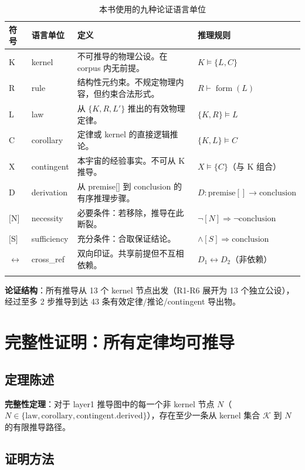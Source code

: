 \begin{center}
\footnotesize
\begin{longtable}{p{0.8cm}p{1.8cm}p{4.5cm}p{7cm}}
\toprule
\textbf{符号} & \textbf{语言单位} & \textbf{定义} & \textbf{推理规则} \\
\midrule
K & kernel & 不可推导的物理公设。在 corpus 内无前提。 & $K \models \{L, C\}$ \\
R & rule & 结构性元约束。不规定物理内容，但约束合法形式。 & $R \vdash \operatorname{form}(L)$ \\
L & law & 从 $\{K, R, L'\}$ 推出的有效物理定律。 & $\{K, R\} \models L$ \\
C & corollary & 定律或 kernel 的直接逻辑推论。 & $\{K, L\} \models C$ \\
X & contingent & 本宇宙的经验事实。不可从 K 推导。 & $X \models \{C\}$（与 K 组合） \\
D & derivation & 从 premise[] 到 conclusion 的有序推理步骤。 & $D: \text{premise}[] \to \text{conclusion}$ \\
$[$N$]$ & necessity & 必要条件：若移除，推导在此断裂。 & $\neg [N] \Rightarrow \neg \text{conclusion}$ \\
$[$S$]$ & sufficiency & 充分条件：合取保证结论。 & $\wedge[S] \Rightarrow \text{conclusion}$ \\
$\leftrightarrow$ & cross\_ref & 双向印证。共享前提但不互相依赖。 & $D_1 \leftrightarrow D_2$（非依赖） \\
\bottomrule
\caption{本书使用的九种论证语言单位}
\end{longtable}
\end{center}

\textbf{论证结构}：所有推导从 13 个 kernel 节点出发（R1-R6 展开为 13 个独立公设），经过至多 2 步推导到达 43 条有效定律/推论/contingent 导出物。

\section{完整性证明：所有定律均可推导}

\subsection{定理陈述}

\textbf{完整性定理}：对于 layer1 推导图中的每一个非 kernel 节点 $N$（$N \in \{\text{law}, \text{corollary}, \text{contingent.derived}\}$），存在至少一条从 kernel 集合 $\mathcal{K}$ 到 $N$ 的有限推导路径。

\subsection{证明方法}

